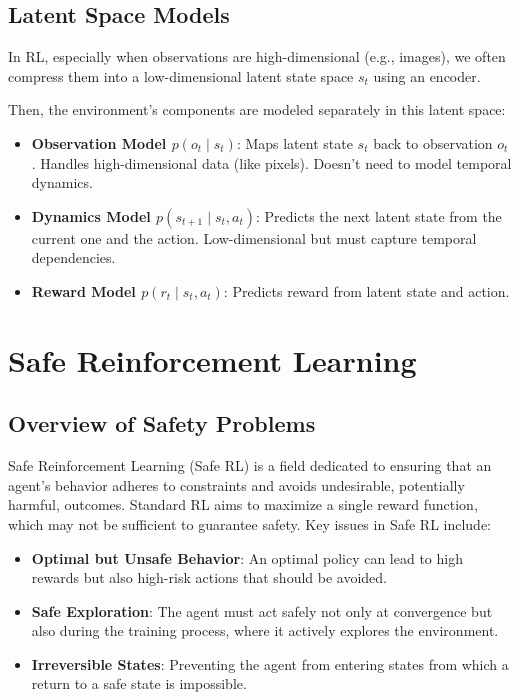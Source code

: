 \documentclass[12pt]{article}
\begin{document}
\subsection{Latent Space Models}
In RL, especially when observations are high-dimensional (e.g., images), we often compress them into a low-dimensional latent state space $s_t$ using an encoder.

Then, the environment’s components are modeled separately in this latent space:
\begin{itemize}
    \item \textbf{Observation Model $p(o_t \mid s_t)$}: Maps latent state $s_t$ back to observation $o_t$. Handles high-dimensional data (like pixels). Doesn’t need to model temporal dynamics.
    \item \textbf{Dynamics Model $p(s_{t+1} \mid s_t, a_t)$}: Predicts the next latent state from the current one and the action. Low-dimensional but must capture temporal dependencies.
    \item \textbf{Reward Model $p(r_t \mid s_t, a_t)$}: Predicts reward from latent state and action.
\end{itemize}

\section{Safe Reinforcement Learning   }

\subsection{Overview of Safety Problems}
Safe Reinforcement Learning (Safe RL) is a field dedicated to ensuring that an agent's behavior adheres to constraints and avoids undesirable, potentially harmful, outcomes. Standard RL aims to maximize a single reward function, which may not be sufficient to guarantee safety. Key issues in Safe RL include:
\begin{itemize}
    \item \textbf{Optimal but Unsafe Behavior}: An optimal policy can lead to high rewards but also high-risk actions that should be avoided.
    \item \textbf{Safe Exploration}: The agent must act safely not only at convergence but also during the training process, where it actively explores the environment.
    \item \textbf{Irreversible States}: Preventing the agent from entering states from which a return to a safe state is impossible.
\end{itemize}
\end{document}
